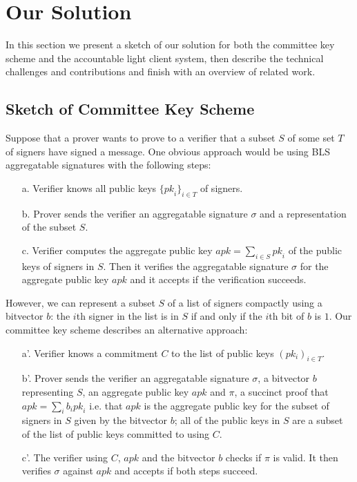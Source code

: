 \section{Our Solution} 
\label{sec:sketch}
\vspace{-0.2cm}

In this section we present a sketch of our solution for both the committee key scheme and the accountable light client system, 
then describe the technical challenges and contributions and finish with an overview of related work.

\vspace{-0.3cm}
\subsection{Sketch of Committee Key Scheme}
\label{sec:lcsketch}
\vspace{-0.1cm}

\noindent Suppose that a prover wants to prove to a verifier that a subset $S$ of some set $T$ of signers have signed a message. 
One obvious approach would be using BLS aggregatable signatures with the following steps:

\begin{itemize}
\item[a.] Verifier knows all public keys $\{\mathit{pk}_i\}_{i \in T}$ of signers.%

\item[b.] Prover sends the verifier an aggregatable signature $\sigma$ and a representation of the subset $S$.

\item[c.] Verifier computes the aggregate public key $\mathit{apk}=\sum_{i \in S} \mathit{pk}_i$ of the public keys of signers in $S$. 
Then it verifies the aggregatable signature $\sigma$ for the aggregate public key $\mathit{apk}$ and it accepts if the verification succeeds.
\end{itemize}

\noindent However, we can represent a subset $S$ of a list of signers compactly using a bitvector $b$: 
the $i$th signer in the list is in $S$ if and only if the $i$th bit of $b$ is $1$. Our committee key scheme describes an alternative approach:

\begin{itemize}
\item[a'.] Verifier knows a commitment $C$ to the list of public keys $(pk_i)_{i \in T}$.

\item[b'.] Prover sends the verifier an aggregatable signature $\sigma$, a bitvector $b$ representing $S$, an aggregate public key 
$\mathit{apk}$ and $\pi$, a succinct proof that $\mathit{apk}=\sum_i b_i \mathit{pk}_i$ i.e. 
that $\mathit{apk}$ is the aggregate public key for the subset of signers in $S$ given by the bitvector $b$; all of the public keys in $S$ are a subset 
of the list of public keys committed to using $C$.

\item[c'.] The verifier using $C$, $\mathit{apk}$ and the bitvector $b$ checks if $\pi$ is valid. 
It then verifies $\sigma$ against $\mathit{apk}$ and accepts if both steps succeed.
\end{itemize}

